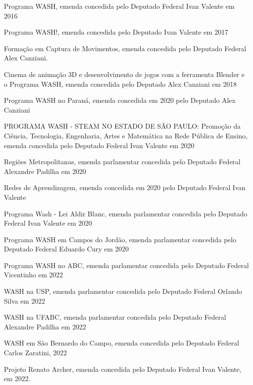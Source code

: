 \documentclass[
12pt,		%
openright,	%
twoside,  %
a4paper,			%
chapter=TITLE,		%
english,			%
french,				%
spanish,			%
brazil				%
]{USPSC-classe/USPSC}
\begin{document}
\begin{alineas}
\item \textquotedbl Programa WASH, emenda concedida pelo Deputado Federal Ivan Valente em 2016
\item \textquotedbl Programa WASH!\textquotedbl , emenda concedida pelo Deputado Ivan Valente em 2017
\item \textquotedbl Forma\c{c}\~ao em Captura de Movimentos\textquotedbl , emenda concedida pelo Deputado Federal Alex Canziani.
\item \textquotedbl Cinema de anima\c{c}\~ao 3D e desenvolvimento de jogos com a ferramenta Blender e o Programa WASH\textquotedbl , emenda concedida pelo Deputado Alex Canziani em 2018
\item \textquotedbl Programa WASH no Paran\'a\textquotedbl , emenda concedida em 2020 pelo Deputado Alex Canziani
\item \textquotedbl PROGRAMA WASH - STEAM NO ESTADO DE S\~AO PAULO: Promo\c{c}\~ao da Ci\^encia, 
Tecnologia, Engenharia, Artes  e Matem\'atica na Rede P\'ublica de Ensino\textquotedbl , emenda concedida pelo Deputado Federal Ivan Valente em 2020

\item \textquotedbl Regi\~oes Metropolitanas\textquotedbl , emenda parlamentar concedida pelo Deputado Federal Alexandre Padilha em 2020
\item \textquotedbl Redes de Aprendizagem\textquotedbl , emenda concedida em 2020 pelo Deputado Federal Ivan Valente
\item \textquotedbl Programa Wash - Lei Aldir Blanc\textquotedbl , emenda parlamentar concedida pelo Deputado Federal  Ivan Valente em 2020
\item \textquotedbl Programa WASH em Campos do Jord\~ao\textquotedbl , emenda parlamentar concedida pelo Deputado Federal Eduardo Cury em 2020
\item \textquotedbl Programa WASH no ABC\textquotedbl , emenda parlamentar concedida pelo Deputado Federal Vicentinho em 2022
\item \textquotedbl WASH na USP\textquotedbl , emenda parlamentar concedida pelo Deputado Federal Orlando Silva em 2022
\item \textquotedbl WASH na UFABC\textquotedbl , emenda parlamentar concedida pelo Deputado Federal Alexandre Padilha em 2022
\item \textquotedbl WASH em S\~ao Bernardo do Campo\textquotedbl , emenda concedida pelo Deputado Federal Carlos Zaratini, 2022
\item \textquotedbl Projeto Renato Archer\textquotedbl , emenda concedida pelo Deputado Federal Ivan Valente, em 2022.
\end{alineas}
\end{document}
